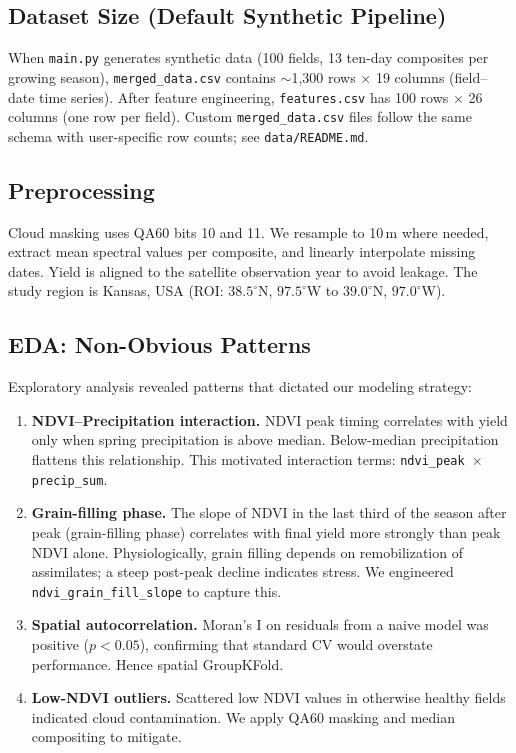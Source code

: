 \documentclass[conference]{IEEEtran}
\begin{document}
\subsection{Dataset Size (Default Synthetic Pipeline)}
When \texttt{main.py} generates synthetic data (100 fields, 13 ten-day composites per growing season), \texttt{merged\_data.csv} contains $\sim$1{,}300 rows $\times$ 19 columns (field--date time series). After feature engineering, \texttt{features.csv} has 100 rows $\times$ 26 columns (one row per field). Custom \texttt{merged\_data.csv} files follow the same schema with user-specific row counts; see \texttt{data/README.md}.

\subsection{Preprocessing}

Cloud masking uses QA60 bits 10 and 11. We resample to 10\,m where needed, extract mean spectral values per composite, and linearly interpolate missing dates. Yield is aligned to the satellite observation year to avoid leakage. The study region is Kansas, USA (ROI: $38.5^\circ$N, $97.5^\circ$W to $39.0^\circ$N, $97.0^\circ$W).

\subsection{EDA: Non-Obvious Patterns}

Exploratory analysis revealed patterns that dictated our modeling strategy:

\begin{enumerate}
  \item \textbf{NDVI--Precipitation interaction.} NDVI peak timing correlates with yield only when spring precipitation is above median. Below-median precipitation flattens this relationship. This motivated interaction terms: \texttt{ndvi\_peak $\times$ precip\_sum}.

  \item \textbf{Grain-filling phase.} The slope of NDVI in the last third of the season after peak (grain-filling phase) correlates with final yield more strongly than peak NDVI alone. Physiologically, grain filling depends on remobilization of assimilates; a steep post-peak decline indicates stress. We engineered \texttt{ndvi\_grain\_fill\_slope} to capture this.

  \item \textbf{Spatial autocorrelation.} Moran's I on residuals from a naive model was positive ($p < 0.05$), confirming that standard CV would overstate performance. Hence spatial GroupKFold.

  \item \textbf{Low-NDVI outliers.} Scattered low NDVI values in otherwise healthy fields indicated cloud contamination. We apply QA60 masking and median compositing to mitigate.
\end{enumerate}
\end{document}
